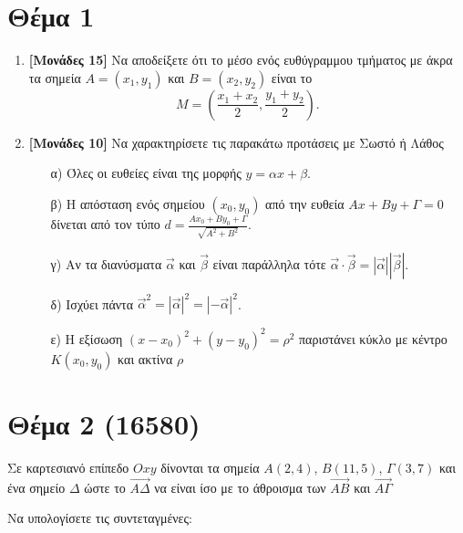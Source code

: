 \documentclass[12pt]{article}
\begin{document}
\section*{Θέμα 1}
\noindent
\begin{enumerate}
 \item \textbf{[Μονάδες 15]} Να αποδείξετε ότι το μέσο ενός ευθύγραμμου τμήματος με άκρα τα σημεία $Α=(x_1,y_1)$ και $Β=(x_2,y_2)$ είναι το
       $$Μ=(\frac{x_1+x_2}{2},\frac{y_1+y_2}{2}) \text{.}$$
 \item \textbf{[Μονάδες 10]} Να χαρακτηρίσετε τις παρακάτω προτάσεις με Σωστό ή Λάθος
       \begin{enumerate}
        \item [α)] Όλες οι ευθείες είναι της μορφής $y=αx+β$.
        \item [β)] Η απόσταση ενός σημείου $(x_0,y_0)$ από την ευθεία $Αx+Βy+Γ=0$ δίνεται από τον τύπο $d=\frac{Αx_0+Βy_0+Γ}{\sqrt{Α^2+Β^2}}$.
        \item [γ)] Αν τα διανύσματα $\vec{α}$ και $\vec{β}$ είναι παράλληλα τότε $\vec{α}\cdot\vec{β}=|\vec{α}||\vec{β}|$.
        \item [δ)] Ισχύει πάντα $\vec{α}^2=|\vec{α}|^2=|-\vec{α}|^2$.
        \item [ε)] Η εξίσωση $(x-x_0)^2+(y-y_0)^2=ρ^2$ παριστάνει κύκλο με κέντρο $Κ(x_0,y_0)$ και ακτίνα $ρ$
       \end{enumerate}
\end{enumerate}

\section*{Θέμα 2 (16580)}
\noindent
Σε καρτεσιανό επίπεδο $Οxy$ δίνονται τα σημεία $Α(2,4)$, $Β(11,5)$, $Γ(3,7)$ και ένα σημείο $Δ$ ώστε το $\overrightarrow{ΑΔ}$ να είναι ίσο με το άθροισμα των $\overrightarrow{ΑΒ}$ και $\overrightarrow{ΑΓ}$

Να υπολογίσετε τις συντεταγμένες:
\end{document}
